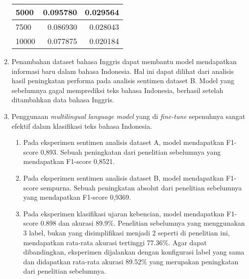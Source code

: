 \begin{enumerate}
\begin{table}[]
\begin{tabular}{|l|r|r|}
        5000                                                                                                 & 0.095780                            & 0.029564                            \\ \hline
        7500                                                                                                 & 0.086930                            & 0.028043                            \\ \hline
        10000                                                                                                & 0.077875                            & 0.020184                            \\ \hline
        \end{tabular}
        \label{tab:gain_conclusion}
    \end{table}
    \item Penambahan dataset bahasa Inggris dapat membantu model mendapatkan informasi baru dalam bahasa Indonesia. Hal ini dapat dilihat dari analisis hasil peningkatan performa pada analisis sentimen dataset B. Model yang sebelumnya gagal memprediksi teks bahasa Indonesia, berhasil setelah ditambahkan data bahasa Inggris.
    \item Penggunaan \textit{multilingual language model} yang di \textit{fine-tune} sepenuhnya sangat efektif dalam klasifikasi teks bahasa Indonesia. 
    \begin{enumerate}
    	\item Pada eksperimen sentimen analisis dataset A, model mendapatkan F1-score 0,893. Sebuah peningkatan dari penelitian sebelumnya yang mendapatkan F1-score 0,8521.
        \item Pada eksperimen sentimen analisis dataset B, model mendapatkan F1-score sempurna. Sebuah peningkatan absolut dari penelitian sebelumnya yang mendapatkan F1-score 0,9369.
        \item Pada eksperimen klasifikasi ujaran kebencian, model mendapatkan F1-score 0.898 dan akurasi 89.9\%. Penelitian sebelumnya yang menggunakan 3 label, bukan yang disimplifikasi menjadi 2 seperti di penelitian ini, mendapatkan rata-rata akurasi tertinggi 77.36\%. Agar dapat dibandingkan, eksperimen dijalankan dengan konfigurasi label yang sama dan didapatkan rata-rata akurasi 89.52\% yang merupakan peningkatan dari penelitian sebelumnya.
    \end{enumerate}

\end{enumerate}

